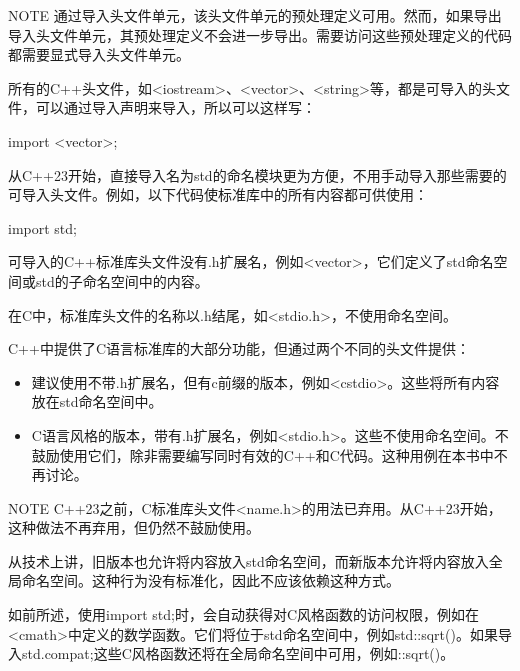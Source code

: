 \begin{myNotic}{NOTE}
通过导入头文件单元，该头文件单元的预处理定义可用。然而，如果导出导入头文件单元，其预处理定义不会进一步导出。需要访问这些预处理定义的代码都需要显式导入头文件单元。
\end{myNotic}


所有的C++头文件，如<iostream>、<vector>、<string>等，都是可导入的头文件，可以通过导入声明来导入，所以可以这样写：

\begin{cpp}
import <vector>;
\end{cpp}

从C++23开始，直接导入名为std的命名模块更为方便，不用手动导入那些需要的可导入头文件。例如，以下代码使标准库中的所有内容都可供使用：

\begin{cpp}
import std;
\end{cpp}

可导入的C++标准库头文件没有.h扩展名，例如<vector>，它们定义了std命名空间或std的子命名空间中的内容。

在C中，标准库头文件的名称以.h结尾，如<stdio.h>，不使用命名空间。

C++中提供了C语言标准库的大部分功能，但通过两个不同的头文件提供：

\begin{itemize}
\item
建议使用不带.h扩展名，但有c前缀的版本，例如<cstdio>。这些将所有内容放在std命名空间中。

\item
C语言风格的版本，带有.h扩展名，例如<stdio.h>。这些不使用命名空间。不鼓励使用它们，除非需要编写同时有效的C++和C代码。这种用例在本书中不再讨论。
\end{itemize}


\begin{myNotic}{NOTE}
C++23之前，C标准库头文件<name.h>的用法已弃用。从C++23开始，这种做法不再弃用，但仍然不鼓励使用。
\end{myNotic}

从技术上讲，旧版本也允许将内容放入std命名空间，而新版本允许将内容放入全局命名空间。这种行为没有标准化，因此不应该依赖这种方式。

如前所述，使用import std;时，会自动获得对C风格函数的访问权限，例如在<cmath>中定义的数学函数。它们将位于std命名空间中，例如std::sqrt()。如果导入std.compat;这些C风格函数还将在全局命名空间中可用，例如::sqrt()。

